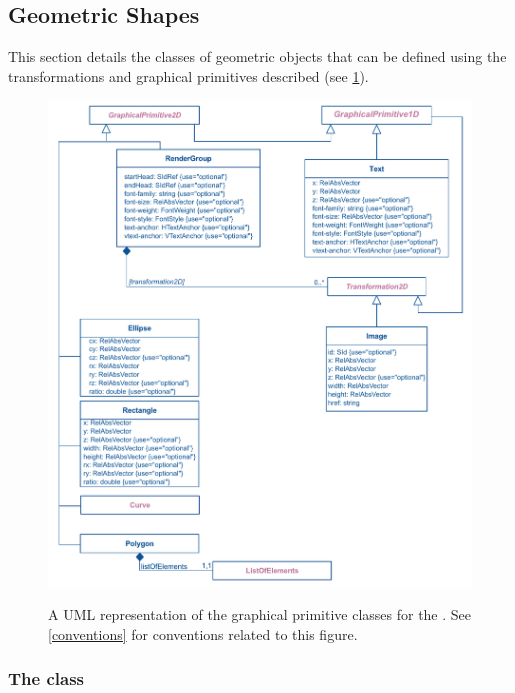 \subsection{Geometric Shapes}
\label{shapes}

This section details the classes of geometric objects that can be defined using 
the transformations and graphical primitives described (see \ref{fig:group_render_uml}).

\begin{figure}[h!]
  \centering
  \includegraphics[width=\textwidth]{images/render-group-uml}\\
  \caption{A UML representation of the graphical primitive classes for the \RenderPackage.  See \ref{conventions} for conventions related to this figure. }
  \label{fig:group_render_uml}
\end{figure}


\subsubsection{The  class}
\label{polygon-class}

